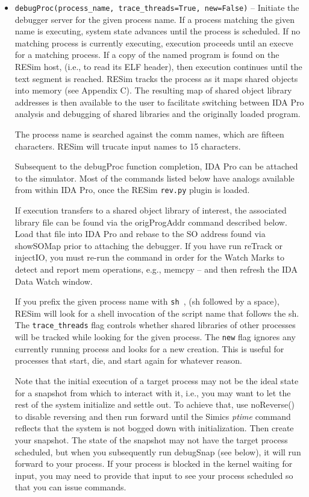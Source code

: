 \documentclass[titlepage]{article}
\begin{document}
\begin{itemize}

\item {\tt debugProc(process\_name, trace\_threads=True, new=False)} – Initiate the debugger server for the given process name.  If a process matching the given name is executing, system state advances until the process is scheduled.  If no matching process is currently executing, execution proceeds until an execve for a matching process.   If a copy of the named program is found on the RESim host, (i.e., to read its ELF header), then execution continues until the text segment is reached.  RESim tracks the process as it maps shared objects into memory (see Appendix C).  The resulting map of shared object library addresses is then available to the user to facilitate switching between IDA Pro analysis and debugging of shared libraries and the originally loaded program.

The process name is searched against the comm names, which are fifteen characters.  RESim will trucate input names to 15 characters.
                                                               

Subsequent to the debugProc  function completion, IDA Pro can be attached to the simulator.  Most of the commands listed below have analogs available from within IDA Pro, once the RESim {\tt rev.py} plugin is loaded.

If execution transfers to a shared object library of interest, the associated library file can be found via the origProgAddr command described below.  Load that file into IDA Pro and rebase to the SO address
found via showSOMap prior to attaching the debugger.  If you have run reTrack or injectIO, you must re-run the command in order for the Watch Marks to 
detect and report mem operations, e.g., memcpy -- and then refresh the IDA Data Watch window. 

If you prefix the given process name with {\tt sh }, (sh followed by a space), RESim will look for a shell invocation of the script name that follows the sh.
The {\tt trace\_threads} flag controls whether shared libraries of other processes will be tracked while looking for the given process.  The {\tt new} flag ignores any currently 
running process and looks for a new creation.  This is useful for processes that start, die, and start again for whatever reason.

Note that the initial execution of a target process may not be the ideal state for a snapshot from which to interact with it, i.e., 
you may want to let the rest of the system initialize and settle out.  To achieve that, use noReverse() to disable reversing and then run forward until the
Simics \textit{ptime} command reflects that the system is not bogged down with initialization.  Then create your snapshot.  The state of the snapshot may not 
have the target process scheduled,  but when you subsequently run debugSnap (see below), it will run forward to your process.  If your process is blocked in
the kernel waiting for input, you may need to provide that input to see your process scheduled so that you can issue commands.


\end{itemize}
\end{document}
